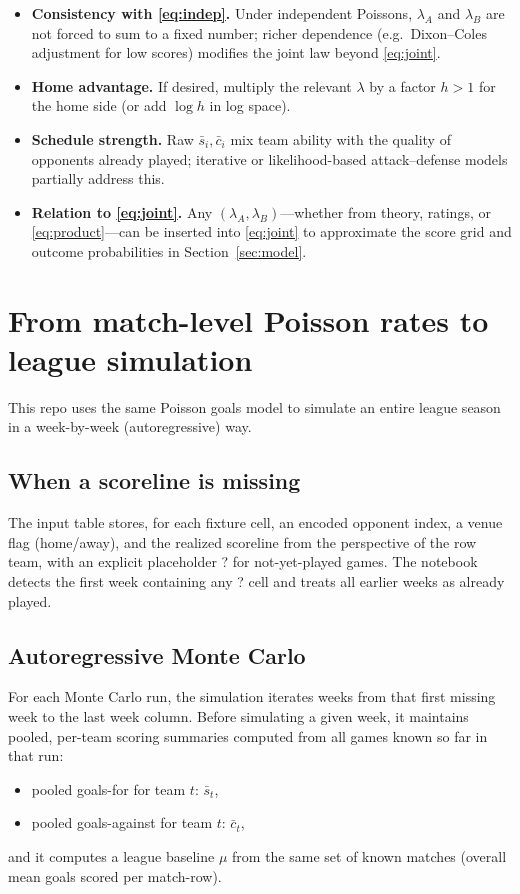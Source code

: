 \documentclass[11pt,a4paper]{article}
\begin{document}
\begin{itemize}
  \item \textbf{Consistency with \eqref{eq:indep}.}
  Under independent Poissons, $\lambda_A$ and $\lambda_B$ are not forced to sum to a fixed number; richer dependence (e.g.\ Dixon--Coles adjustment for low scores) modifies the joint law beyond \eqref{eq:joint}.

  \item \textbf{Home advantage.}
  If desired, multiply the relevant $\lambda$ by a factor $h > 1$ for the home side (or add $\log h$ in log space).

  \item \textbf{Schedule strength.}
  Raw $\bar{s}_i,\bar{c}_i$ mix team ability with the quality of opponents already played; iterative or likelihood-based attack--defense models partially address this.

  \item \textbf{Relation to \eqref{eq:joint}.}
  Any $(\lambda_A,\lambda_B)$---whether from theory, ratings, or \eqref{eq:product}---can be inserted into \eqref{eq:joint} to approximate the score grid and outcome probabilities in Section~\ref{sec:model}.
\end{itemize}

\noindent
\section{From match-level Poisson rates to league simulation}
\label{sec:league-sim}

This repo uses the same Poisson goals model to simulate an entire league season in a week-by-week (autoregressive) way.

\subsection{When a scoreline is missing}
The input table stores, for each fixture cell, an encoded opponent index, a venue flag (home/away), and the realized scoreline from the perspective of the row team, with an explicit placeholder ? for not-yet-played games.
The notebook detects the first week containing any ? cell and treats all earlier weeks as already played.

\subsection{Autoregressive Monte Carlo}
For each Monte Carlo run, the simulation iterates weeks from that first missing week to the last week column.
Before simulating a given week, it maintains pooled, per-team scoring summaries computed from all games known so far in that run:
\begin{itemize}
  \item pooled goals-for for team $t$: $\bar{s}_t$,
  \item pooled goals-against for team $t$: $\bar{c}_t$,
\end{itemize}
and it computes a league baseline $\mu$ from the same set of known matches (overall mean goals scored per match-row).
\end{document}
